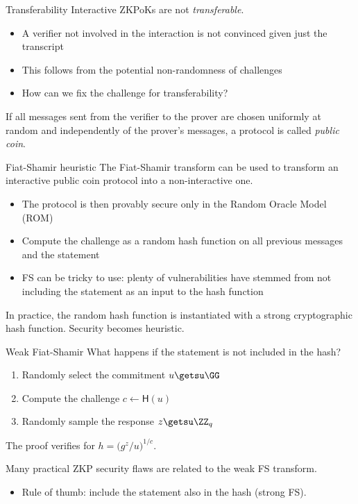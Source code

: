 \begin{frame}{Transferability}
  Interactive ZKPoKs are not \emph{transferable}.
  \begin{itemize}[<+(1)->]
    \item A verifier not involved in the interaction is not convinced given just the transcript
    \item This follows from the potential non-randomness of challenges
    \item How can we fix the challenge for transferability?
  \end{itemize}

  \vspace*{1em}

  \pause
  If all messages sent from the verifier to the prover are chosen uniformly at random and independently of the prover's messages, a protocol is called \emph{public coin}.
\end{frame}

\begin{frame}{Fiat-Shamir heuristic}
  The Fiat-Shamir transform can be used to transform an interactive public coin protocol into a non-interactive one.
  \begin{itemize}[<+(1)->]
    \item The protocol is then provably secure only in the Random Oracle Model (ROM)
    \item Compute the challenge as a random hash function on all previous messages and the statement
    \item FS can be tricky to use: plenty of vulnerabilities have stemmed from not including the statement as an input to the hash function
  \end{itemize}

  \pause
  In practice, the random hash function is instantiated with a strong cryptographic hash function.
  Security becomes heuristic.
\end{frame}

\begin{frame}{Weak Fiat-Shamir}
  What happens if the statement is not included in the hash?

  \begin{enumerate}[<+(1)->]
    \item Randomly select the commitment $u \getsu \GG$
    \item Compute the challenge $c \gets \mathsf{H}(u)$
    \item Randomly sample the response $z \getsu \ZZ_q$
  \end{enumerate}

  \pause
  The proof verifies for $h = \bigl(g^z/u\bigr)^{1/c}$.

  \vspace*{1em}

  \pause
  Many practical ZKP security flaws are related to the weak FS transform.
  \begin{itemize}
    \item Rule of thumb: include the statement also in the hash (strong FS).
  \end{itemize}
\end{frame}

